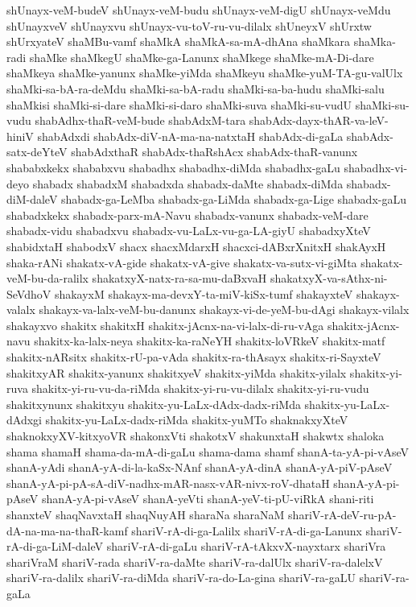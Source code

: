 {shUnayx-veM-budeV
shUnayx-veM-budu
shUnayx-veM-digU
shUnayx-veMdu
shUnayxveV
shUnayxvu
shUnayx-vu-toV-ru-vu-dilalx
shUneyxV
shUrxtw
shUrxyateV
shaMBu-vamf
shaMkA
shaMkA-sa-mA-dhAna
shaMkara
shaMka-radi
shaMke
shaMkegU
shaMke-ga-Lanunx
shaMkege
shaMke-mA-Di-dare
shaMkeya
shaMke-yanunx
shaMke-yiMda
shaMkeyu
shaMke-yuM-TA-gu-valUlx
shaMki-sa-bA-ra-deMdu
shaMki-sa-bA-radu
shaMki-sa-ba-hudu
shaMki-salu
shaMkisi
shaMki-si-dare
shaMki-si-daro
shaMki-suva
shaMki-su-vudU
shaMki-su-vudu
shabAdhx-thaR-veM-bude
shabAdxM-tara
shabAdx-dayx-thAR-va-leV-hiniV
shabAdxdi
shabAdx-diV-nA-ma-na-natxtaH
shabAdx-di-gaLa
shabAdx-satx-deYteV
shabAdxthaR
shabAdx-thaRshAcx
shabAdx-thaR-vanunx
shababxkekx
shababxvu
shabadhx
shabadhx-diMda
shabadhx-gaLu
shabadhx-vi-deyo
shabadx
shabadxM
shabadxda
shabadx-daMte
shabadx-diMda
shabadx-diM-daleV
shabadx-ga-LeMba
shabadx-ga-LiMda
shabadx-ga-Lige
shabadx-gaLu
shabadxkekx
shabadx-parx-mA-Navu
shabadx-vanunx
shabadx-veM-dare
shabadx-vidu
shabadxvu
shabadx-vu-LaLx-vu-ga-LA-giyU
shabadxyXteV
shabidxtaH
shabodxV
shacx
shacxMdarxH
shacxci-dABxrXnitxH
shakAyxH
shaka-rANi
shakatx-vA-gide
shakatx-vA-give
shakatx-va-sutx-vi-giMta
shakatx-veM-bu-da-ralilx
shakatxyX-natx-ra-sa-mu-daBxvaH
shakatxyX-va-sAthx-ni-SeVdhoV
shakayxM
shakayx-ma-devxY-ta-miV-kiSx-tumf
shakayxteV
shakayx-valalx
shakayx-va-lalx-veM-bu-danunx
shakayx-vi-de-yeM-bu-dAgi
shakayx-vilalx
shakayxvo
shakitx
shakitxH
shakitx-jAcnx-na-vi-lalx-di-ru-vAga
shakitx-jAcnx-navu
shakitx-ka-lalx-neya
shakitx-ka-raNeYH
shakitx-loVRkeV
shakitx-matf
shakitx-nARsitx
shakitx-rU-pa-vAda
shakitx-ra-thAsayx
shakitx-ri-SayxteV
shakitxyAR
shakitx-yanunx
shakitxyeV
shakitx-yiMda
shakitx-yilalx
shakitx-yi-ruva
shakitx-yi-ru-vu-da-riMda
shakitx-yi-ru-vu-dilalx
shakitx-yi-ru-vudu
shakitxynunx
shakitxyu
shakitx-yu-LaLx-dAdx-dadx-riMda
shakitx-yu-LaLx-dAdxgi
shakitx-yu-LaLx-dadx-riMda
shakitx-yuMTo
shaknakxyXteV
shaknokxyXV-kitxyoVR
shakonxVti
shakotxV
shakunxtaH
shakwtx
shaloka
shama
shamaH
shama-da-mA-di-gaLu
shama-dama
shamf
shanA-ta-yA-pi-vAseV
shanA-yAdi
shanA-yA-di-la-kaSx-NAnf
shanA-yA-dinA
shanA-yA-piV-pAseV
shanA-yA-pi-pA-sA-diV-nadhx-mAR-nasx-vAR-nivx-roV-dhataH
shanA-yA-pi-pAseV
shanA-yA-pi-vAseV
shanA-yeVti
shanA-yeV-ti-pU-viRkA
shani-riti
shanxteV
shaqNavxtaH
shaqNuyAH
sharaNa
sharaNaM
shariV-rA-deV-ru-pA-dA-na-ma-na-thaR-kamf
shariV-rA-di-ga-Lalilx
shariV-rA-di-ga-Lanunx
shariV-rA-di-ga-LiM-daleV
shariV-rA-di-gaLu
shariV-rA-tAkxvX-nayxtarx
shariVra
shariVraM
shariV-rada
shariV-ra-daMte
shariV-ra-dalUlx
shariV-ra-dalelxV
shariV-ra-dalilx
shariV-ra-diMda
shariV-ra-do-La-gina
shariV-ra-gaLU
shariV-ra-gaLa
}
